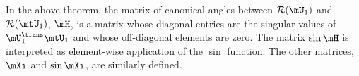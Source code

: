 \noindent
In the above theorem, the matrix of canonical angles between 
$\mathcal{R}(\mU_1)$ and $\mathcal{R}(\mtU_1)$, $\mH$, is a matrix whose
diagonal entries are the singular values of $\mU_1^\trans \mtU_1$ and whose
off-diagonal elements are zero.  The matrix $\sin \mH$ is interpreted as element-wise application of the $\sin$ function.  The other matrices, $\mXi$ and $\sin \mXi$, are similarly defined.